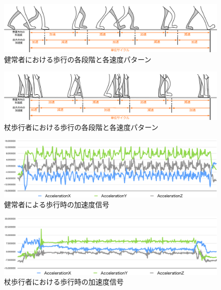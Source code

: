 \begin{figure}[tbhp]
  \begin{center}
  \includegraphics[width=1\hsize]{image/Fig-3.png}
  \caption{健常者における歩行の各段階と各速度パターン}
  \label{fig:03se}
  \end{center}
\end{figure}
\begin{figure}[tbhp]
  \begin{center}
  \includegraphics[width=1\hsize]{image/Fig-4.png}
  \caption{杖歩行者における歩行の各段階と各速度パターン}
  \label{fig:04se}
  \end{center}
\end{figure}


\begin{figure}[tbhp]
  \begin{center}
  \includegraphics[width=1\hsize]{image/Fig-5-kenjo.png}
  \caption{健常者による歩行時の加速度信号}
  \label{fig:051se}
  \end{center}
\end{figure}
\begin{figure}[tbhp]
  \begin{center}
  \includegraphics[width=1\hsize]{image/Fig-5-tue.png}
  \caption{杖歩行者における歩行時の加速度信号}
  \label{fig:052se}
  \end{center}
\end{figure}


